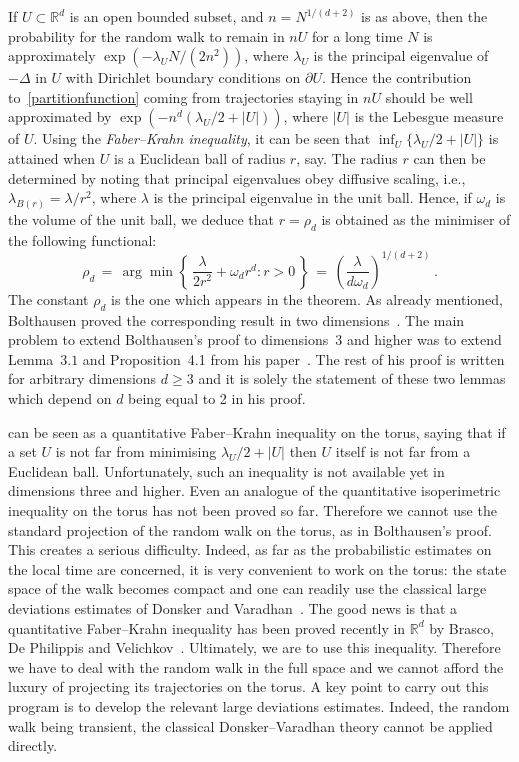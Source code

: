 \documentclass[AHL, Unicode, longabstracts, published]{cedram}
\newcommand*\Rd {{\mathbb R^d}}
\newcommand*\R{\mathbb{R}}
\begin{document}
If $U\subset \R^d$ is an open bounded subset, and $n = N^{1/ (d+2)}$ is as above, then the probability for the random walk to remain in $nU$ for a long time $N$ is approximately $\exp (- \lambda_U N/(2n^2))$, where $\lambda_U$ is the principal eigenvalue of $- \Delta$ in $U$ with Dirichlet boundary conditions on $\partial U$. Hence the contribution to~\eqref{partitionfunction} coming from trajectories staying in $nU$ should be well approximated by $\exp (- n^d (\lambda_U/2 + |U|))$, where $|U|$ is the Lebesgue measure of $U$. Using the \emph{Faber--Krahn inequality}, it can be seen that $\inf_U \{\lambda_U/2 + |U|\}$ is attained when $U$ is a Euclidean ball of radius $r$, say. The radius $r$ can then be determined by noting that principal eigenvalues obey diffusive scaling, i.e., $\lambda_{B(r) } = \lambda / r^2$, where $\lambda$ is the principal eigenvalue in the unit ball. Hence, if $\omega_d $ is the volume of the unit ball, we deduce that $r = \rho_d$ is obtained as the minimiser of the following functional:
\[
\rho_d \,=\,\arg \min \left\{\,\frac{\lambda}{2r^2} + \omega_d r^d:r>0\,\right\}\, = \,\left(\frac{\lambda}{d \omega_d} \right)^{1/ (d+2)}\,.
\]
The constant $\rho_d$ is the one which appears in the theorem. As already mentioned, Bolthausen proved the corresponding result in two dimensions~\cite{BO}. The main problem to extend Bolthausen's proof to dimensions~$3$ and higher was to extend Lemma~$3.1$ and Proposition~4.1 from his paper~\cite{BO}. The rest of his proof is written for arbitrary dimensions $d\ge 3$ and it is solely the statement of these two lemmas which depend on $d$ being equal to 2 in his proof.

\cite[Lemma~3.1]{BO} can be seen as a quantitative Faber--Krahn inequality on the torus, saying that if a set $U$ is not far from minimising $\lambda_U/2 + |U|$ then $U$ itself is not far from a Euclidean ball. Unfortunately, such an inequality is not available yet in dimensions three and higher. Even an analogue of the quantitative isoperimetric inequality on the torus has not been proved so far. Therefore we cannot use the standard projection of the random walk on the torus, as in Bolthausen's proof. This creates a serious difficulty. Indeed, as far as the probabilistic estimates on the local time are concerned, it is very convenient to work on the torus: the state space of the walk becomes compact and one can readily use the classical large deviations estimates of Donsker and Varadhan~\cite{DV1}. The good news is that a quantitative Faber--Krahn inequality has been proved recently in $\Rd$ by Brasco, De Philippis and Velichkov~\cite{BLGV}. Ultimately, we are to use this inequality. Therefore we have to deal with the random walk in the full space and we cannot afford the luxury of projecting its trajectories on the torus. A key point to carry out this program is to develop the relevant large deviations estimates. Indeed, the random walk being transient, the classical Donsker--Varadhan theory cannot be applied directly.
\end{document}
